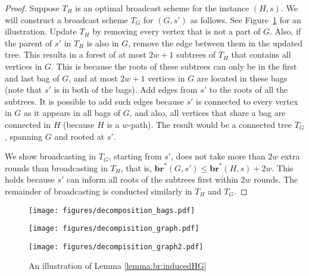\documentclass[letterpaper,11pt]{article}
\newcommand{\bropt}{{\boldsymbol{br}^*}}
\newcommand{\pwidth}{w}
\begin{document}
\begin{proof}
 Suppose $T_H$ is an optimal broadcast scheme for the instance $(H,s)$. We will construct a broadcast scheme $T_G$ for $(G,s')$ as follows. See Figure~\ref{fig:decomposition_bag_graphs} for an illustration. Update $T_H$ by removing every vertex that is not a part of $G$. Also, if the parent of $s'$ in $T_H$ is also in $G$, remove the edge between them in the updated tree.
 This results in a forest of at most $2\pwidth+1$ subtrees of $T_H$ that contains all vertices in $G$. 
 This is because the roots of these subtrees can only be in the first and last bag of $G$, and at most $2\pwidth+1$ vertices in $G$ are located in these bags (note that $s'$ is in both of the bags). 
 Add edges from $s'$ to the roots of all the subtrees. It is possible to add such edges because $s'$ is connected to every vertex in $G$ as it appears in all bags of $G$, and also, all vertices that share a bag are connected in $H$ (because $H$ is a $\pwidth$-path).
 The result would be a connected tree $T_G$, spanning $G$ and rooted at $s'$. 
 
We show broadcasting in $T_G$, starting from $s'$, does not take more than $2\pwidth$ extra rounds than broadcasting in $T_H$, that is, $\bropt(G,s') \leq \bropt(H,s)+2w$. This holds because $s'$ can inform all roots of the subtrees first within  $2\pwidth$ rounds. The remainder of broadcasting is conducted similarly in $T_H$ and $T_G$. 
\end{proof}

\begin{figure}
    \centering
    \begin{minipage}[b]{0.5\textwidth}
        \centering
        \texttt{[image: figures/decomposition\_bags.pdf]}  \label{fig:decomposition_bags}
        
    \end{minipage}
    \hfill
    \begin{minipage}[b]{0.2\textwidth} \centering
        \texttt{[image: figures/decompisition\_graph.pdf]}  \label{fig:decomposition_graph}
    \end{minipage}
    \hfill
    \begin{minipage}[b]{0.25\textwidth} \centering
        \texttt{[image: figures/decompisition\_graph2.pdf]}  \label{fig:decomposition_graph2}
    \end{minipage}
    \caption{An illustration of Lemma \ref{lemma:br:inducedHG}}
    \label{fig:decomposition_bag_graphs}
\end{figure}
\end{document}
